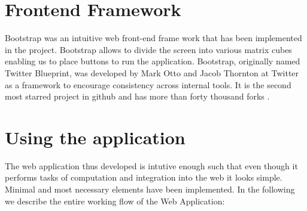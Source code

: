 \section{Frontend Framework}
Bootstrap was an intuitive web front-end frame work that has been implemented in the project.  Bootstrap allows to divide the screen into various matrix cubes enabling us to place buttons to run the application. Bootstrap, originally named Twitter Blueprint, was developed by Mark Otto and Jacob Thornton at Twitter as a framework to encourage consistency across internal tools. It is the second most starred project in github and has more than forty thousand forks \cite{bootstrap}.


\section{Using the application}
The web application thus developed is intutive enough such that even though it performs tasks of computation and integration into the web it looks simple. Minimal and most necessary elements have been implemented.
In the following we describe the entire working flow of the Web Application:
